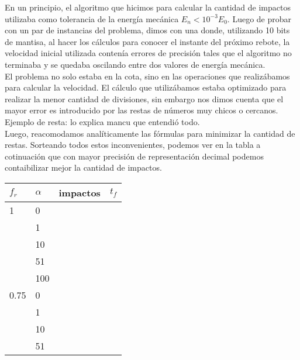 \documentclass[10pt, a4paper,english,spanish]{article}
\begin{document}
En un principio, el algoritmo que hicimos para calcular la cantidad de impactos utilizaba como tolerancia de la energía mecánica $E_n < 10^{-3}E_0$.
Luego de probar con un par de instancias del problema, dimos con una donde, utilizando 10 bits de mantisa, al hacer los cálculos para conocer el instante del próximo rebote, la velocidad inicial utilizada contenía errores de precisión tales que el algoritmo no terminaba y se quedaba oscilando entre dos valores de energía mecánica.\\

El problema no solo estaba en la cota, sino en las operaciones que realizábamos para calcular la velocidad. El cálculo que utilizábamos estaba optimizado para realizar la menor cantidad de divisiones, sin embargo nos dimos cuenta que el mayor error es introducido por las restas de números muy chicos o cercanos.\\

Ejemplo de resta: lo explica mancu que entendió todo.\\

Luego, reacomodamos analíticamente las fórmulas para minimizar la cantidad de restas.
Sorteando todos estos inconvenientes, podemos ver en la tabla a cotinuación que con mayor precisión de representación decimal podemos contaibilizar mejor la cantidad de impactos.

\begin{center}
\begin{tabular}{|ll|ll|}
\hline
$f_r$ & $\alpha$ & impactos & $t_f$\\ \hline
1 & 0 & {} & {}\\
  & 1 & {} & {}\\
  & 10 & {} & {}\\
  & 51 & {} & {}\\
  & 100 & {} & {}\\ \hline
0.75 & 0 & {} & {}\\
     & 1 & {} & {}\\
     & 10 & {} & {}\\
     & 51 & {} & {}\\ \hline
\end{tabular}
\end{center}
\end{document}
